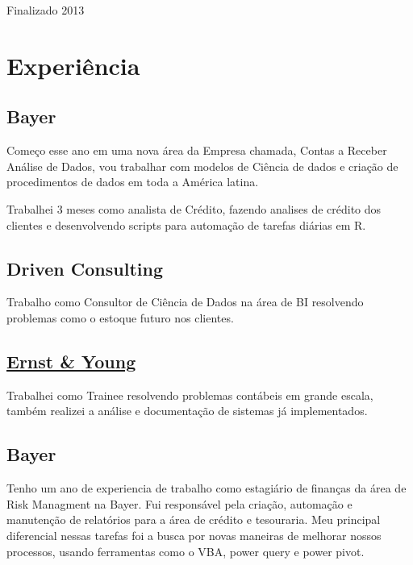 \documentclass[11pt, a4paper]{awesome-cv}
\begin{document}
Finalizado 2013

\hypertarget{experiuxeancia}{%
\section{Experiência}\label{experiuxeancia}}

\hypertarget{bayer}{%
\subsection{Bayer}\label{bayer}}

Começo esse ano em uma nova área da Empresa chamada, Contas a Receber Análise de Dados, vou trabalhar com modelos de Ciência de dados e criação de procedimentos de dados em toda a América latina.

Trabalhei 3 meses como analista de Crédito, fazendo analises de crédito dos clientes e desenvolvendo scripts para automação de tarefas diárias em R.

\hypertarget{driven-consulting}{%
\subsection{Driven Consulting}\label{driven-consulting}}

Trabalho como Consultor de Ciência de Dados na área de BI resolvendo problemas como o estoque futuro nos clientes.

\hypertarget{ernst-young}{%
\subsection{\texorpdfstring{\href{https://www.ey.com/br/pt/services/assurance/financial-accounting-advisory-services}{Ernst \& Young}}{Ernst \& Young}}\label{ernst-young}}

Trabalhei como Trainee resolvendo problemas contábeis em grande escala, também realizei a análise e documentação de sistemas já implementados.

\hypertarget{bayer-1}{%
\subsection{Bayer}\label{bayer-1}}

Tenho um ano de experiencia de trabalho como estagiário de finanças da área de Risk Managment na Bayer. Fui responsável pela criação, automação e manutenção de relatórios para a área de crédito e tesouraria. Meu principal diferencial nessas tarefas foi a busca por novas maneiras de melhorar nossos processos, usando ferramentas como o VBA, power query e power pivot.
\end{document}
